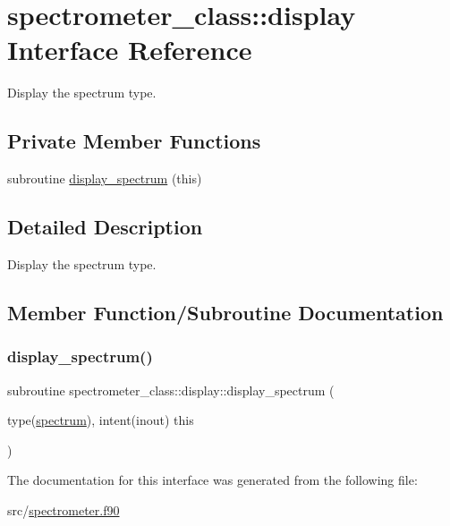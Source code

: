 \hypertarget{interfacespectrometer__class_1_1display}{}\section{spectrometer\+\_\+class\+:\+:display Interface Reference}
\label{interfacespectrometer__class_1_1display}


Display the spectrum type.  


\subsection*{Private Member Functions}
\begin{DoxyCompactItemize}
\item 
subroutine \hyperlink{interfacespectrometer__class_1_1display_ad2a5c61a3b9a1a59d5fc73d97e3141ff}{display\+\_\+spectrum} (this)
\end{DoxyCompactItemize}


\subsection{Detailed Description}
Display the spectrum type. 

\subsection{Member Function/\+Subroutine Documentation}
\mbox{\label{interfacespectrometer__class_1_1display_ad2a5c61a3b9a1a59d5fc73d97e3141ff}} 
\subsubsection{\texorpdfstring{display\+\_\+spectrum()}{display\_spectrum()}}
{\footnotesize\ttfamily subroutine spectrometer\+\_\+class\+::display\+::display\+\_\+spectrum (\begin{DoxyParamCaption}\item[{type(\hyperlink{structspectrometer__class_1_1spectrum}{spectrum}), intent(inout)}]{this }\end{DoxyParamCaption})\hspace{0.3cm}{\ttfamily [private]}}



The documentation for this interface was generated from the following file\+:\begin{DoxyCompactItemize}
\item 
src/\hyperlink{spectrometer_8f90}{spectrometer.\+f90}\end{DoxyCompactItemize}
